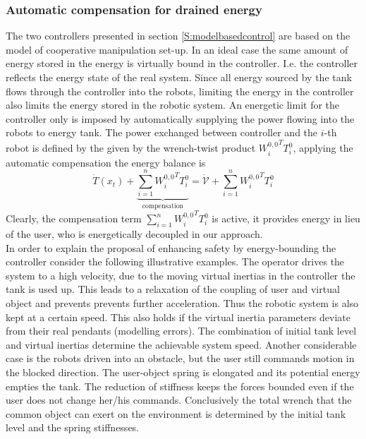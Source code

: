 \documentclass[a4paper,twoside, openright,12pt]{report}
\begin{document}
\subsubsection{Automatic compensation for drained energy}
The two controllers presented in section \ref{S:modelbasedcontrol} are based on the model of cooperative manipulation set-up. In an ideal case the same amount of energy stored in the energy is virtually bound in the controller. I.e. the controller reflects the energy state of the real system. Since all energy sourced by the tank flows through the controller into the robots, limiting the energy in the controller  also limits the energy stored in the robotic system.
An energetic limit for the controller only is imposed by automatically supplying the power flowing into the robots to energy tank. The power exchanged between controller and the $i$-th robot is defined by the given by the wrench-twist product ${W_i^{0,0}}^T T_i^0$, applying the automatic compensation the energy balance is
\begin{equation}
\dot{T}(x_t) + \underbrace{\sum_{i=1}^n {W_i^{0,0}}^T T_i^0}_{\text{compensation}} = \dot{\mathcal{V}} + \sum_{i=1}^n {W_i^{0,0}}^T T_i^0
\end{equation}
Clearly, the compensation term $\sum_{i=1}^n {W_i^{0,0}}^T T_i^0$ is active, it provides energy in lieu of the user, who is energetically decoupled in our approach.\\ 
In order to explain the proposal of enhancing safety by energy-bounding the controller consider the following illustrative examples.
The operator drives the system to a high velocity, due to the moving virtual inertias in the controller the tank is used up. This leads to a relaxation of the coupling of user and virtual object and prevents prevents further acceleration. Thus  the robotic system is also kept at a certain speed. This also holds if the virtual inertia parameters deviate from their real pendants (modelling errors). The combination of initial tank level and virtual inertias determine the achievable system speed. 
Another considerable case is the robots driven into an obstacle, but the user still commands motion in the blocked direction. The user-object spring is elongated and its potential energy empties the tank. The reduction of stiffness keeps the forces bounded even if the user does not change her/his commands. Conclusively the total wrench that the common object can exert on the environment is determined by the initial tank level and the spring stiffnesses. 
\end{document}
